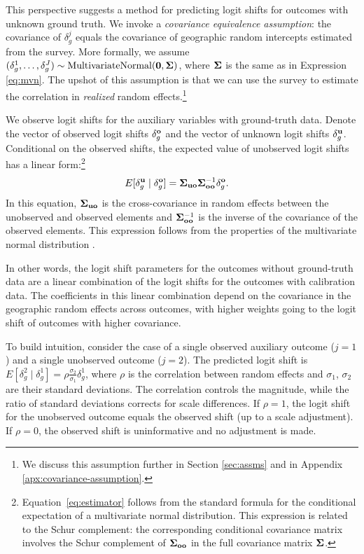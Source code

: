 This perspective suggests a method for predicting logit shifts for outcomes with unknown ground truth. 
We invoke a \textit{covariance equivalence assumption}: the covariance of $\delta_g^j$ equals the covariance of geographic random intercepts estimated from the survey. 
More formally, we assume $(\delta_g^1, \dots, \delta_g^J) \sim \text{MultivariateNormal}(\mathbf{0}, \mathbf{\Sigma})$, where $\mathbf{\Sigma}$ is the same as in Expression \ref{eq:mvn}.
The upshot of this assumption is that we can use the survey to estimate the correlation in \textit{realized} random effects.\footnote{We discuss this assumption further in Section \ref{sec:assms} and in Appendix \ref{apx:covariance-assumption}.}

We observe logit shifts for the auxiliary variables with ground-truth data. 
Denote the vector of observed logit shifts $\delta_g^{\mathbf{o}}$ and the vector of unknown logit shifts $\delta_g^{\mathbf{u}}$.
Conditional on the observed shifts, the expected value of unobserved logit shifts has a linear form:\footnote{Equation~\eqref{eq:estimator} follows from the standard formula for the conditional expectation of a multivariate normal distribution. This expression is related to the Schur complement: the corresponding conditional covariance matrix involves the Schur complement of $\mathbf{\Sigma}_{\mathbf{oo}}$ in the full covariance matrix $\mathbf{\Sigma}$.}
\begin{align}
	E[\delta_g^{\mathbf{u}} \mid \delta_g^{\mathbf{o}}] &= \mathbf{\Sigma}_{\mathbf{uo}} \mathbf{\Sigma}_{\mathbf{oo}}^{-1} \delta_g^{\mathbf{o}}. \label{eq:estimator}
\end{align}
In this equation, $\mathbf{\Sigma}_{\mathbf{uo}}$ is the cross-covariance in random effects between the unobserved and observed elements and $\mathbf{\Sigma}_{\mathbf{oo}}^{-1}$ is the inverse of the covariance of the observed elements.
This expression follows from the properties of the multivariate normal distribution \citep[116]{Eaton2007}.




In other words, the logit shift parameters for the outcomes without ground-truth data are a linear combination of the logit shifts for the outcomes with calibration data. 
The coefficients in this linear combination depend on the covariance in the geographic random effects across outcomes, with higher weights going to the logit shift of outcomes with higher covariance.  

To build intuition, consider the case of a single observed auxiliary outcome ($j=1$) and a single unobserved outcome ($j=2$). \label{page:twooutcomes}
The predicted logit shift is $E[\delta^2_g\mid \delta_{g}^{1}]  = \rho \frac{\sigma_{2}}{\sigma_1} \delta_g^1$, where $\rho$ is the correlation between random effects and $\sigma_1$, $\sigma_{2}$ are their standard deviations. 
The correlation controls the magnitude, while the ratio of standard deviations corrects for scale differences.
If $\rho = 1$, the logit shift for the unobserved outcome equals the observed shift (up to a scale adjustment). 
If $\rho = 0$, the observed shift is uninformative and no adjustment is made.


